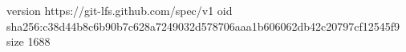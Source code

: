 version https://git-lfs.github.com/spec/v1
oid sha256:c38d44b8c6b90b7c628a7249032d578706aaa1b606062db42c20797cf12545f9
size 1688
